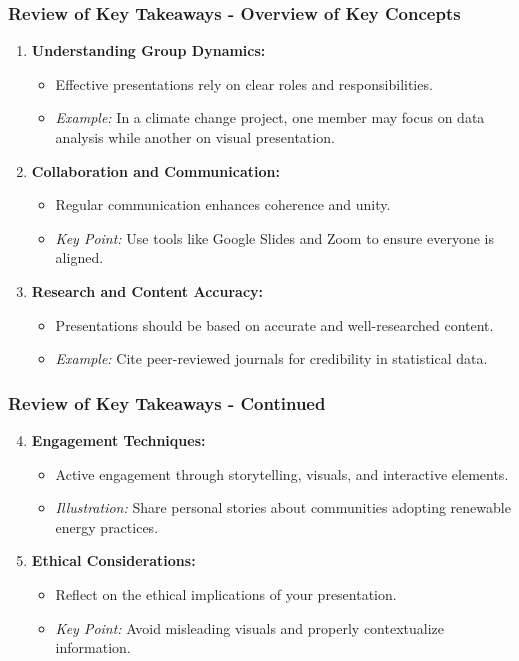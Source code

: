 \documentclass[aspectratio=169]{beamer}
\begin{document}
\begin{frame}[fragile]
    \frametitle{Review of Key Takeaways - Overview of Key Concepts}
    \begin{enumerate}
        \item \textbf{Understanding Group Dynamics:}
        \begin{itemize}
            \item Effective presentations rely on clear roles and responsibilities.
            \item \textit{Example:} In a climate change project, one member may focus on data analysis while another on visual presentation.
        \end{itemize}
        
        \item \textbf{Collaboration and Communication:}
        \begin{itemize}
            \item Regular communication enhances coherence and unity.
            \item \textit{Key Point:} Use tools like Google Slides and Zoom to ensure everyone is aligned.
        \end{itemize}
        
        \item \textbf{Research and Content Accuracy:}
        \begin{itemize}
            \item Presentations should be based on accurate and well-researched content.
            \item \textit{Example:} Cite peer-reviewed journals for credibility in statistical data.
        \end{itemize}
    \end{enumerate}
\end{frame}

\begin{frame}[fragile]
    \frametitle{Review of Key Takeaways - Continued}
    \begin{enumerate}
        \setcounter{enumi}{3}
        \item \textbf{Engagement Techniques:}
        \begin{itemize}
            \item Active engagement through storytelling, visuals, and interactive elements.
            \item \textit{Illustration:} Share personal stories about communities adopting renewable energy practices.
        \end{itemize}
        
        \item \textbf{Ethical Considerations:}
        \begin{itemize}
            \item Reflect on the ethical implications of your presentation.
            \item \textit{Key Point:} Avoid misleading visuals and properly contextualize information.
        \end{itemize}
    \end{enumerate}
\end{frame}
\end{document}
